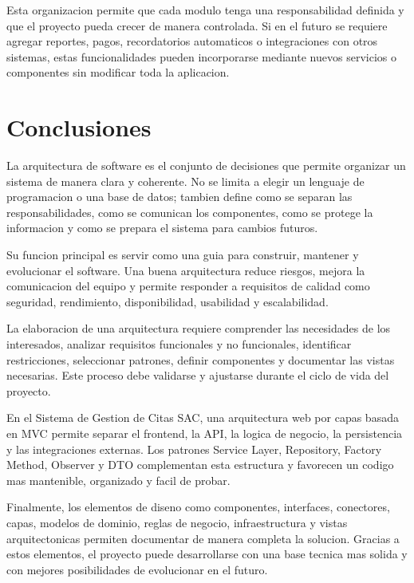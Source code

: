 \documentclass[12pt,letterpaper]{article}
\begin{document}
Esta organizacion permite que cada modulo tenga una responsabilidad definida y que el proyecto pueda crecer de manera controlada. Si en el futuro se requiere agregar reportes, pagos, recordatorios automaticos o integraciones con otros sistemas, estas funcionalidades pueden incorporarse mediante nuevos servicios o componentes sin modificar toda la aplicacion.

\section{Conclusiones}

La arquitectura de software es el conjunto de decisiones que permite organizar un sistema de manera clara y coherente. No se limita a elegir un lenguaje de programacion o una base de datos; tambien define como se separan las responsabilidades, como se comunican los componentes, como se protege la informacion y como se prepara el sistema para cambios futuros.

Su funcion principal es servir como una guia para construir, mantener y evolucionar el software. Una buena arquitectura reduce riesgos, mejora la comunicacion del equipo y permite responder a requisitos de calidad como seguridad, rendimiento, disponibilidad, usabilidad y escalabilidad.

La elaboracion de una arquitectura requiere comprender las necesidades de los interesados, analizar requisitos funcionales y no funcionales, identificar restricciones, seleccionar patrones, definir componentes y documentar las vistas necesarias. Este proceso debe validarse y ajustarse durante el ciclo de vida del proyecto.

En el Sistema de Gestion de Citas SAC, una arquitectura web por capas basada en MVC permite separar el frontend, la API, la logica de negocio, la persistencia y las integraciones externas. Los patrones Service Layer, Repository, Factory Method, Observer y DTO complementan esta estructura y favorecen un codigo mas mantenible, organizado y facil de probar.

Finalmente, los elementos de diseno como componentes, interfaces, conectores, capas, modelos de dominio, reglas de negocio, infraestructura y vistas arquitectonicas permiten documentar de manera completa la solucion. Gracias a estos elementos, el proyecto puede desarrollarse con una base tecnica mas solida y con mejores posibilidades de evolucionar en el futuro.
\end{document}
